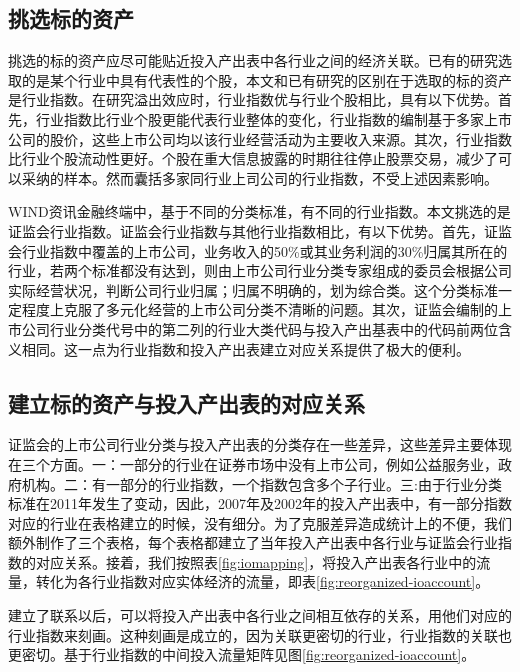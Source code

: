 \documentclass{sysuthesis}
\begin{document}
\subsection{挑选标的资产}

挑选的标的资产应尽可能贴近投入产出表中各行业之间的经济关联。已有的研究选取的是某个行业中具有代表性的个股，本文和已有研究的区别在于选取的标的资产是行业指数。在研究溢出效应时，行业指数优与行业个股相比，具有以下优势。首先，行业指数比行业个股更能代表行业整体的变化，行业指数的编制基于多家上市公司的股价，这些上市公司均以该行业经营活动为主要收入来源。其次，行业指数比行业个股流动性更好。个股在重大信息披露的时期往往停止股票交易，减少了可以采纳的样本。然而囊括多家同行业上司公司的行业指数，不受上述因素影响。

WIND资讯金融终端中，基于不同的分类标准，有不同的行业指数。本文挑选的是证监会行业指数。证监会行业指数与其他行业指数相比，有以下优势。首先，证监会行业指数中覆盖的上市公司，业务收入的50\%或其业务利润的30\%归属其所在的行业，若两个标准都没有达到，则由上市公司行业分类专家组成的委员会根据公司实际经营状况，判断公司行业归属；归属不明确的，划为综合类\cite{_2012_????}。这个分类标准一定程度上克服了多元化经营的上市公司分类不清晰的问题。其次，证监会编制的上市公司行业分类代号中的第二列的行业大类代码与投入产出基表中的代码前两位含义相同。这一点为行业指数和投入产出表建立对应关系提供了极大的便利。

\subsection {建立标的资产与投入产出表的对应关系}

证监会的上市公司行业分类与投入产出表的分类存在一些差异，这些差异主要体现在三个方面。一：一部分的行业在证券市场中没有上市公司，例如公益服务业，政府机构。二：有一部分的行业指数，一个指数包含多个子行业。三:由于行业分类标准在2011年发生了变动，因此，2007年及2002年的投入产出表中，有一部分指数对应的行业在表格建立的时候，没有细分。为了克服差异造成统计上的不便，我们额外制作了三个表格，每个表格都建立了当年投入产出表中各行业与证监会行业指数的对应关系。接着，我们按照表\ref{fig:iomapping}，将投入产出表各行业中的流量，转化为各行业指数对应实体经济的流量，即表\ref{fig:reorganized-ioaccount}。  

建立了联系以后，可以将投入产出表中各行业之间相互依存的关系，用他们对应的行业指数来刻画。这种刻画是成立的，因为关联更密切的行业，行业指数的关联也更密切。基于行业指数的中间投入流量矩阵见图\ref{fig:reorganized-ioaccount}。
\end{document}
